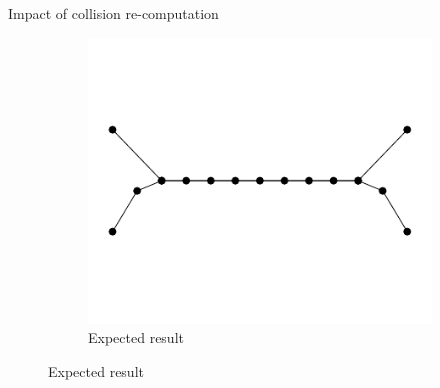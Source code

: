 \documentclass[aspectratio=1610,t,10pt]{beamer}
\begin{document}
\begin{frame}
\begin{columns}[t]
\begin{column}{.48\textwidth}
\begin{block}{Impact of collision re-computation}
\begin{figure}
\begin{subfigure}[t]{0.48\textwidth}
                    \includegraphics[width=0.8\linewidth]{img/res-collision/disloc-plot-2}
                    \caption{Expected result}
                \end{subfigure}
                

\end{figure}
\end{block}
\end{column}
\end{columns}
\end{frame}
\end{document}
